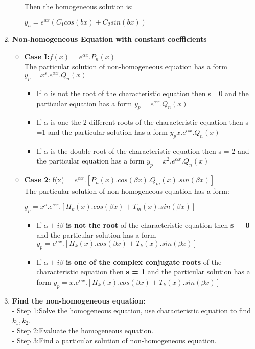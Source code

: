 \documentclass[10pt]{article}
\begin{document}
\begin{enumerate}
\begin{itemize}
		 Then the homogeneous solution is:
		 \begin{mybox}
		 \begin{center}
		 $y_h = e^{ax} (C_1cos(bx) + C_2sin(bx))$
		 \end{center}
		 \end{mybox} 
	\end{itemize}
	\item \textbf{Non-homogeneous Equation with constant coefficients}
	\begin{itemize}
		\item \textbf{Case I:$f(x) = e^{\alpha x}.P_n(x)$}\\
		The particular solution of non-homogeneous equation has a form $y_p = x^s.e^{\alpha x}.Q_n(x)$
		\begin{itemize}
			\item If $\alpha$ is not the root of the characteristic equation then s =0 and the particular equation has a form $y_p = e^{\alpha x}.Q_n(x)$
			\item If $\alpha$ is one the 2 different roots of the characteristic equation then s =1 and the particular solution has a form $y_p x.e^{\alpha x}.Q_n(x)$
			\item If $\alpha$ is the double root of the characteristic equation then s = 2 and the particular equation has a form $y_p = x^2.e^{\alpha x}.Q_n(x)$
		\end{itemize}
		\item \textbf{Case 2}: f(x) = $e^{\alpha x}.[P_n(x).cos(\beta x).Q_m(x).sin(\beta x)]$\\
		The particular solution of non-homogeneous equation has a form:
		\begin{center}
		$y_p = x^s.e^{\alpha x}.[H_k(x).cos(\beta x) + T_m(x).sin(\beta x)]$
		\end{center}
		\begin{itemize}
			\item If $\alpha + i \beta$ \textbf{is not the root} of the characteristic equation then \textbf{s = 0} and the particular solution has a form $y_p = e^{\alpha x}.[H_k(x).cos(\beta x) + T_k(x).sin(\beta x)]$
			\item If $\alpha + i \beta$ \textbf{is one of the complex conjugate roots} of the characteristic equation then \textbf{s = 1} and the particular solution has a form $y_p = x.e^{\alpha x}.[H_k(x).cos(\beta x) + T_k(x).sin(\beta x)]$
		\end{itemize}
	\end{itemize}	
		\item \textbf{Find the non-homogeneous equation:}\\
		- Step 1:Solve the homogeneous equation, use characteristic equation to find $k_{1},k_{2}$.\\
		- Step 2:Evaluate the homogeneous equation.\\
		- Step 3:Find a particular solution of non-homogeneous equation. 
\end{enumerate}		   
\end{document}
